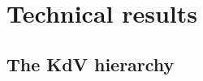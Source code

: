 \documentclass[a4paper,10pt,reqno]{article}
\theoremstyle{definition}
\theoremstyle{plain}
\theoremstyle{plain}
\theoremstyle{definition}
\theoremstyle{plain}
\theoremstyle{plain}
\theoremstyle{plain}
\newtheorem{lemma}[definition]{Lemma}
\theoremstyle{definition}
\theoremstyle{definition}
\newcommand{\norm}[1]{\left\lVert #1 \right\rVert}
\def \N{\mathbb N}
\def \B{\mathcal{B}}
\begin{document}

\,

\appendix

\section{Technical results}

\subsection{The KdV hierarchy} \label{proof lemma first integrals}

\end{document}
